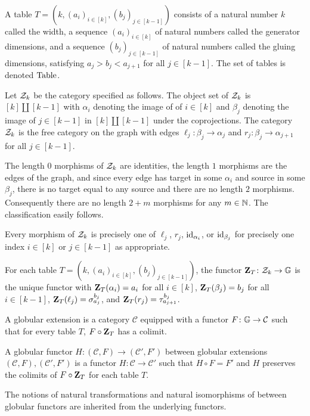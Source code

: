 A table $T = (k, (a_i)_{i \in [k]}, (b_j)_{j \in [k - 1]})$ consists of a natural number $k$ called the width, a sequence $(a_i)_{i \in [k]}$ of natural numbers called the generator dimensions, and a sequence $(b_j)_{j \in [k - 1]}$ of natural numbers called the gluing dimensions, satisfying $a_j > b_j < a_{j + 1}$ for all $j \in [k -1]$. The set of tables is denoted $\mathrm{Table}$.

Let $\mathcal{Z}_k$ be the category specified as follows. The object set of $\mathcal{Z}_k$ is $[k] \amalg [k - 1]$ with $\alpha_i$ denoting the image of of $i \in [k]$ and $\beta_j$ denoting the image of $j \in [k - 1]$ in $[k] \amalg [k-1]$ under the coprojections. The category $\mathcal{Z}_k$ is the free category on the graph with edges $\ell_j \colon \beta_j \to \alpha_j$ and $r_j \colon \beta_j \to \alpha_{j + 1}$ for all $j \in [k - 1]$.

The length $0$ morphisms of $\mathcal{Z}_k$ are identities, the length $1$ morphisms are the edges of the graph, and since every edge has target in some $\alpha_i$ and source in some $\beta_j$, there is no target equal to any source and there are no length $2$ morphisms. Consequently there are no length $2 + m$ morphisms for any $m \in \mathbb{N}$. The classification easily follows.

Every morphism of $\mathcal{Z}_k$ is precisely one of $\ell_j$, $r_j$, $\mathrm{id}_{\alpha_i}$, or $\mathrm{id}_{\beta_j}$ for precisely one index $i \in [k]$ or $j \in [k - 1]$ as appropriate.

For each table $T = (k, (a_i)_{i \in [k]}, (b_j)_{j \in [k - 1]})$, the functor $\mathbf{Z}_T \colon \mathcal{Z}_k \to \mathbb{G}$ is the unique functor with $\mathbf{Z}_T(\alpha_i) = a_i$ for all $i \in [k]$, $\mathbf{Z}_T(\beta_j) = b_j$ for all $i \in [k-1]$, $\mathbf{Z}_T(\ell_j) = \sigma^{b_j}_{a_j}$, and $\mathbf{Z}_T(r_j) = \tau^{b_{j}}_{a_{j+1}}$.

A globular extension is a category $\mathcal{C}$ equipped with a functor $F \colon \mathbb{G} \to \mathcal{C}$ such that for every table $T$, $F \circ \mathbf{Z}_T$ has a colimit.

A globular functor $H \colon (\mathcal{C}, F) \to (\mathcal{C}', F')$ between globular extensions $(\mathcal{C}, F), (\mathcal{C}', F')$ is a functor $H \colon \mathcal{C} \to \mathcal{C'}$ such that $H \circ F = F'$ and $H$ preserves the colimits of $F \circ \mathbf{Z}_T$ for each table $T$.

The notions of natural transformations and natural isomorphisms of between globular functors are inherited from the underlying functors.

